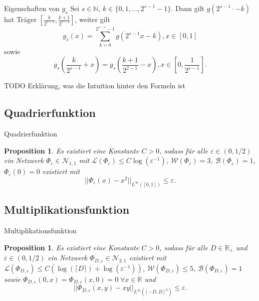 \documentclass[10pt,aspectratio=169]{beamer}
\newtheorem{proposition}[theorem]{Proposition}
\newcommand{\N}{\mathbb{N}} %
\newcommand{\R}{\mathbb{R}} %
\newcommand{\set}[1]{\{#1\}}
\begin{document}
\begin{frame}{Eigenschaften von \(g_s\)}
    Sei \(s\in\N\), \(k \in \set{0,1,\ldots, 2^{s-1}-1}\). Dann gilt \(g(2^{s-1} \cdot - k)\) 
    hat Träger \([\frac{k}{2^{s-1}}, \frac{k+1}{2^{s-1}}]\), weiter gilt 
    \[ g_s(x) = \sum_{k=0}^{2^{s-1}-1} g(2^{s-1}x - k), x\in [0,1] \]
    sowie 
    \[ g_s\left(\frac{k}{2^{s-1}}+x\right) = g_s\left(\frac{k+1}{2^{2-1}} - x\right), x \in \left[0, \frac{1}{2^{s-1}} \right]. \]

    TODO Erklärung, was die Intuition hinter den Formeln ist
\end{frame}

\subsection{Quadrierfunktion}

\begin{frame}{Quadrierfunktion}
    \begin{proposition} %
        Es existiert eine Konstante \(C>0\), sodass für alle \(\varepsilon \in (0,1/2)\) 
        ein Netzwerk \(\Phi_\varepsilon \in \mathcal{N}_{1,1}\) mit 
        \(\mathcal{L}(\Phi_\varepsilon) \leq C\log(\varepsilon^{-1})\), 
        \(\mathcal{W}(\Phi_\varepsilon) = 3\), \(\mathcal{B}(\Phi_\varepsilon) = 1\), 
        \(\Phi_\varepsilon(0) = 0\) existiert mit 
        \[ ||\Phi_\varepsilon(x) - x^2 ||_{L^\infty([0,1])} \leq \varepsilon. \]
    \end{proposition}
\end{frame}

\subsection{Multiplikationsfunktion}

\begin{frame}{Multiplikationsfunktion}
    \begin{proposition} %
        Es existiert eine Konstante \(C>0\), sodass für alle \(D\in \R_+\) und \(\varepsilon \in (0, 1/2)\) 
        ein Netzwerk \(\Phi_{D,\varepsilon} \in \mathcal{N}_{2,1}\) existiert mit 
        \(\mathcal{L}(\Phi_{D, \varepsilon}) \leq C (\log(\lceil D \rceil) + \log(\varepsilon^{-1})) \), 
        \(\mathcal{W}(\Phi_{D, \varepsilon}) \leq 5\), \(\mathcal{B}(\Phi_{D, \varepsilon}) = 1\) sowie 
        \(\Phi_{D,\varepsilon}(0,x) = \Phi_{D,\varepsilon}(x,0) = 0 \;\forall x\in \R\) und 
        \[ ||\Phi_{D,\varepsilon}(x,y) - xy||_{L^\infty([-D,D]^2)} \leq \varepsilon. \]
    \end{proposition}
\end{frame}
\end{document}
